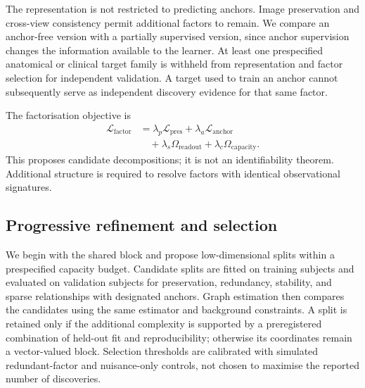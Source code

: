 \documentclass[10pt,twocolumn,letterpaper]{article}
\begin{document}
The representation is not restricted to predicting anchors. Image preservation and cross-view consistency permit additional factors to remain. We compare an anchor-free version with a partially supervised version, since anchor supervision changes the information available to the learner. At least one prespecified anatomical or clinical target family is withheld from representation and factor selection for independent validation. A target used to train an anchor cannot subsequently serve as independent discovery evidence for that same factor.

The factorisation objective is
\begin{equation}
 \begin{aligned}
 \mathcal L_{\mathrm{factor}}
 &=\lambda_p\mathcal L_{\mathrm{pres}}+\lambda_a\mathcal L_{\mathrm{anchor}}\\
 &\quad+\lambda_s\Omega_{\mathrm{readout}}+\lambda_c\Omega_{\mathrm{capacity}}.
 \end{aligned}
\end{equation}
This proposes candidate decompositions; it is not an identifiability theorem. Additional structure is required to resolve factors with identical observational signatures.

\subsection{Progressive refinement and selection}

We begin with the shared block and propose low-dimensional splits within a prespecified capacity budget. Candidate splits are fitted on training subjects and evaluated on validation subjects for preservation, redundancy, stability, and sparse relationships with designated anchors. Graph estimation then compares the candidates using the same estimator and background constraints. A split is retained only if the additional complexity is supported by a preregistered combination of held-out fit and reproducibility; otherwise its coordinates remain a vector-valued block. Selection thresholds are calibrated with simulated redundant-factor and nuisance-only controls, not chosen to maximise the reported number of discoveries.
\end{document}

